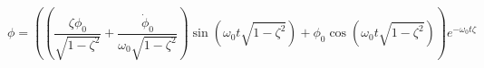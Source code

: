 \begin{equation}
\phi = \left(\left(\frac{\zeta \phi_{0}}{\sqrt{1 - \zeta^{2}}} + \frac{\dot{\phi}_{0}}{\omega_{0} \sqrt{1 - \zeta^{2}}}\right) \operatorname{sin}\left(\omega_{0} t \sqrt{1 - \zeta^{2}}\right) + \phi_{0} \operatorname{cos}\left(\omega_{0} t \sqrt{1 - \zeta^{2}}\right)\right) e^{- \omega_{0} t \zeta}
\end{equation}
